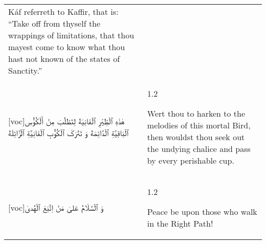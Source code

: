 \documentclass[11pt]{article}
\makeatletter
\newenvironment{orig}
  {\begin{farsi}[voc]}
  {\end{farsi}}
\newenvironment{trans}
  {\Large\begin{spacing}{1.2}\raggedright\vspace{1.75ex}}
  {\end{spacing}\vspace{-1ex}}
\newenvironment{word}
  {\begin{longtable}[t]{p{2.75in}@{\hspace{3em}}p{2.875in}}}
  {\end{longtable}}
\newcommand{\ayat}[2]{\begin{orig}#1\end{orig} & \begin{trans}#2\end{trans}}
\makeatother
\begin{document}
\begin{word}
     {Káf referreth to Kaffir, that is: “Take off from thyself the wrappings of limitations, that thou mayest come to know what thou hast not known of the states of Sanctity.”}
     \\
\ayat{هٰذَهِ ٱلْطِّيْرِ ٱلْفَانِيَةْ لِتَطْلُبَ مِنْ أَلْکُؤُسِ ٱلْبَاقِيَّةِ ٱلْدَّائِمَةْ وَ تَتْرَکَ ٱلْکُؤُبِ ٱلْفَانِيَّةِ ٱلْزَّائِلَةْ}
     {Wert thou to harken to the melodies of this mortal Bird, then wouldst thou seek out the undying chalice and pass by every perishable cup.}
     \\
\ayat{وَ ٱلْسَّلَامُ عَلىٰ مَنْ اِتَّبَعَ ٱلْهُدىٰ}
     {Peace be upon those who walk in the Right Path!}
     \\
\end{word}
\end{document}
